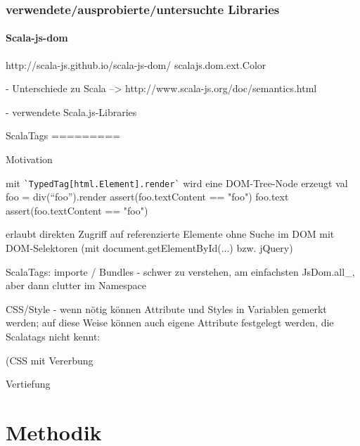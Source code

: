 \documentclass[a4paper, 12pt, listof=totoc, bibliography=totoc]{scrreprt}
\begin{document}
\subsection{verwendete/ausprobierte/untersuchte Libraries}

\subsubsection{Scala-js-dom}

http://scala-js.github.io/scala-js-dom/
scalajs.dom.ext.Color



- Unterschiede zu Scala  -->  http://www.scala-js.org/doc/semantics.html


- verwendete Scala.js-Libraries

ScalaTags
=========

Motivation



mit \texttt{\`{}TypedTag[html.Element].render\`} wird eine DOM-Tree-Node erzeugt
  val foo = div("`foo"').render
  assert(foo.textContent == "foo")
  foo.text
  assert(foo.textContent == "foo")

erlaubt direkten Zugriff auf referenzierte Elemente ohne Suche im DOM mit DOM-Selektoren (mit document.getElementById(...) bzw. jQuery)

ScalaTags: importe / Bundles - schwer zu verstehen, am einfachsten JsDom.all\_, aber dann clutter im Namespace

CSS/Style - wenn nötig können Attribute und Styles in Variablen gemerkt werden; auf diese Weise können auch eigene Attribute festgelegt werden, die Scalatags nicht kennt:

(CSS mit Vererbung

Vertiefung


\chapter{Methodik}
\end{document}
